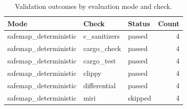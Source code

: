 \begin{table}[t]
\centering
\caption{Validation outcomes by evaluation mode and check.}
\label{tab:safemap-validation-statuses}
\begin{tabular}{lllr}
\hline
Mode & Check & Status & Count \\
\hline
safemap\_deterministic & c\_sanitizers & passed & 4 \\
safemap\_deterministic & cargo\_check & passed & 4 \\
safemap\_deterministic & cargo\_test & passed & 4 \\
safemap\_deterministic & clippy & passed & 4 \\
safemap\_deterministic & differential & passed & 4 \\
safemap\_deterministic & miri & skipped & 4 \\
\hline
\end{tabular}
\end{table}

